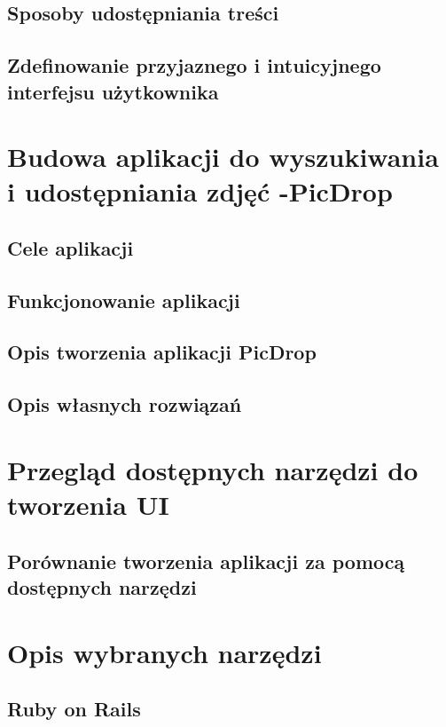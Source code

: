\documentclass[brudnopis]{xmgr}
\begin{document}
\section{Sposoby udostępniania treści\label{s:dtd}}

\section{Zdefinowanie przyjaznego i intuicyjnego interfejsu użytkownika}

\chapter{Budowa aplikacji do wyszukiwania i udostępniania zdjęć -PicDrop }

\section{Cele aplikacji}

\section{Funkcjonowanie aplikacji}

\section{Opis tworzenia aplikacji PicDrop}

\section{Opis własnych rozwiązań}   

\chapter{Przegląd dostępnych narzędzi do tworzenia UI }

\section{ Porównanie tworzenia aplikacji za pomocą dostępnych narzędzi\label{s:dsssl}}

\chapter{Opis wybranych narzędzi\label{s:xsl}}

\section{Ruby on Rails}
\end{document}
